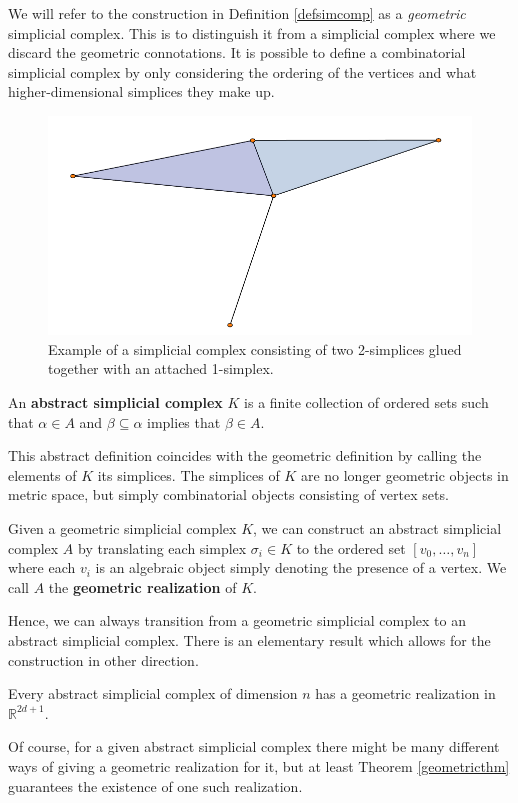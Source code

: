 We will refer to the construction in Definition \ref{defsimcomp} as a \textit{geometric} simplicial complex. This is to distinguish it from a simplicial complex where we discard the geometric connotations. It is possible to define a combinatorial simplicial complex by only considering the ordering of the vertices and what higher-dimensional simplices they make up.

\begin{figure}
  \centering
  \includegraphics[scale=0.7]{complex.pdf}
  \caption{ \label{complex2} Example of a simplicial complex consisting of two 2-simplices glued together with an attached 1-simplex.}
\end{figure}

\begin{definition}
An \textbf{abstract simplicial complex} $K$ is a finite collection of ordered sets such that $\alpha \in A$ and $\beta \subseteq \alpha$ implies that $\beta \in A$.
\end{definition}

This abstract definition coincides with the geometric definition by calling the elements of $K$ its simplices. The simplices of $K$ are no longer geometric objects in metric space, but simply combinatorial objects consisting of vertex sets.

\begin{definition}
Given a geometric simplicial complex $K$, we can construct an abstract simplicial complex $A$ by translating each simplex $\sigma_{i} \in K$ to the ordered set $[v_{0},\dots,v_{n}]$ where each $v_{i}$ is an algebraic object simply denoting the presence of a vertex. We call $A$ the \textbf{geometric realization} of $K$.
\end{definition}
Hence, we can always transition from a geometric simplicial complex to an abstract simplicial complex. There is an elementary result which allows for the construction in other direction.
\begin{theorem}\label{geometricthm}
Every abstract simplicial complex of dimension $n$ has a geometric realization in $\mathbb{R}^{2d+1}$.
\end{theorem}
Of course, for a given abstract simplicial complex there might be many different ways of giving a geometric realization for it, but at least Theorem \ref{geometricthm} guarantees the existence of one such realization.

